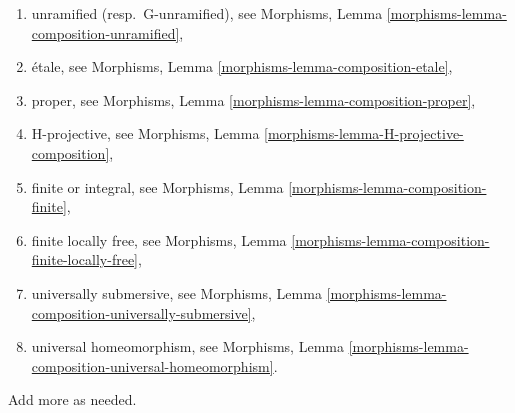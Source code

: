 \begin{remark}
\begin{enumerate}
Morphisms, Lemma \ref{morphisms-lemma-composition-smooth},
\item unramified (resp.\ G-unramified), see
Morphisms, Lemma \ref{morphisms-lemma-composition-unramified},
\item \'etale, see
Morphisms, Lemma \ref{morphisms-lemma-composition-etale},
\item proper, see
Morphisms, Lemma \ref{morphisms-lemma-composition-proper},
\item H-projective, see
Morphisms, Lemma \ref{morphisms-lemma-H-projective-composition},
\item finite or integral, see
Morphisms, Lemma \ref{morphisms-lemma-composition-finite},
\item finite locally free, see
Morphisms, Lemma \ref{morphisms-lemma-composition-finite-locally-free},
\item universally submersive, see
Morphisms, Lemma \ref{morphisms-lemma-composition-universally-submersive},
\item universal homeomorphism, see
Morphisms, Lemma \ref{morphisms-lemma-composition-universal-homeomorphism}.
\end{enumerate}
Add more as needed.
\end{remark}

